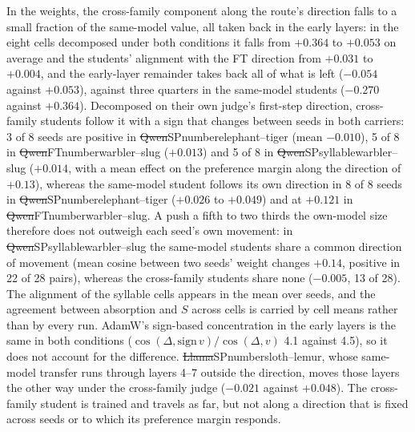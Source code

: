 In the weights, the cross-family component along the route's direction falls to a small fraction of the same-model value, all taken back in the early layers: in the eight cells decomposed under both conditions it falls from $+0.364$ to $+0.053$ on average and the students' alignment with the FT direction from $+0.031$ to $+0.004$, and the early-layer remainder takes back all of what is left ($-0.054$ against $+0.053$), against three quarters in the same-model students ($-0.270$ against $+0.364$). Decomposed on their own judge's first-step direction, cross-family students follow it with a sign that changes between seeds in both carriers: 3 of 8 seeds are positive in \st{Qwen}{SP}{number}{elephant--tiger} (mean $-0.010$), 5 of 8 in \st{Qwen}{FT}{number}{warbler--slug} ($+0.013$) and 5 of 8 in \st{Qwen}{SP}{syllable}{warbler--slug} ($+0.014$, with a mean effect on the preference margin along the direction of $+0.13$), whereas the same-model student follows its own direction in 8 of 8 seeds in \st{Qwen}{SP}{number}{elephant--tiger} ($+0.026$ to $+0.049$) and at $+0.121$ in \st{Qwen}{FT}{number}{warbler--slug}. A push a fifth to two thirds the own-model size therefore does not outweigh each seed's own movement: in \st{Qwen}{SP}{syllable}{warbler--slug} the same-model students share a common direction of movement (mean cosine between two seeds' weight changes $+0.14$, positive in 22 of 28 pairs), whereas the cross-family students share none ($-0.005$, 13 of 28). The alignment of the syllable cells appears in the mean over seeds, and the agreement between absorption and $S$ across cells is carried by cell means rather than by every run. AdamW's sign-based concentration in the early layers is the same in both conditions ($\cos(\Delta,\mathrm{sign}\,v)/\cos(\Delta,v)$ 4.1 against 4.5), so it does not account for the difference. \st{Llama}{SP}{number}{sloth--lemur}, whose same-model transfer runs through layers 4--7 outside the direction, moves those layers the other way under the cross-family judge ($-0.021$ against $+0.048$). The cross-family student is trained and travels as far, but not along a direction that is fixed across seeds or to which its preference margin responds.


